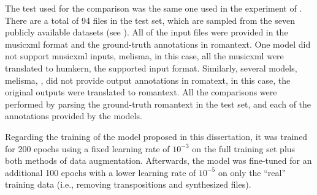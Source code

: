 
The test used for the comparison was the same one used in
the experiment of .
There are a total of 94 files in the test set, which are
sampled from the seven publicly available datasets (see
). All of the input files
were provided in the \gls{musicxml} format and the
ground-truth annotations in \gls{romantext}. One model did
not support \gls{musicxml} inputs, \gls{melisma}, in this
case, all the \gls{musicxml} were translated to
\gls{humkern}, the supported input format. Similarly,
several models, \gls{melisma}, \textcite{chen2021attend,
mcleod2021modular}, did not provide output annotations in
\gls{romatext}, in this case, the original outputs were
translated to \gls{romantext}. All the comparisons were
performed by parsing the ground-truth \gls{romantext} in the
test set, and each of the annotations provided by the
models. 

Regarding the training of the model proposed in this
dissertation, it was trained for 200 epochs using a fixed
learning rate of $10^{-3}$ on the full training set plus
both methods of data augmentation. Afterwards, the model was
fine-tuned for an additional 100 epochs with a lower
learning rate of $10^{-5}$ on only the ``real'' training
data (i.e., removing transpositions and synthesized files).

